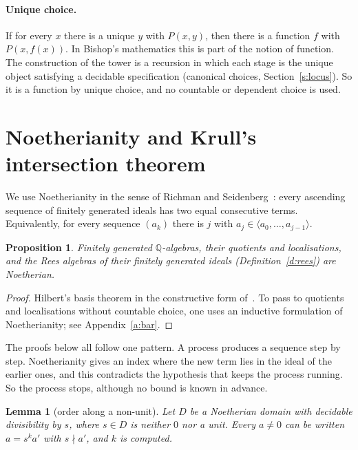 \documentclass[11pt]{article}
\newcommand{\Q}{\mathbb{Q}}
\numberwithin{equation}{section}
\theoremstyle{plain}
\newtheorem{proposition}[theorem]{Proposition}
\newtheorem{lemma}[theorem]{Lemma}
\theoremstyle{definition}
\theoremstyle{remark}
\begin{document}
\paragraph{Unique choice.} If for every $x$ there is a unique $y$ with $P(x,y)$, then there is a
function $f$ with $P(x,f(x))$. In Bishop's mathematics this is part of the notion of function. The
construction of the tower is a recursion in which each stage is the unique object satisfying a
decidable specification (canonical choices, Section~\ref{s:locus}). So it is a function by unique
choice, and no countable or dependent choice is used.

\section{Noetherianity and Krull's intersection theorem}\label{s:noeth}

We use Noetherianity in the sense of Richman and Seidenberg~\cite[II-3.2]{LQ}: every ascending
sequence of finitely generated ideals has two equal consecutive terms. Equivalently, for every
sequence $(a_k)$ there is $j$ with $a_j\in\langle a_0,\dots,a_{j-1}\rangle$.

\begin{proposition}\label{p:hilbert}
Finitely generated $\Q$-algebras, their quotients and localisations, and the Rees algebras of
their finitely generated ideals (Definition~\ref{d:rees}) are Noetherian.
\end{proposition}

\begin{proof}
Hilbert's basis theorem in the constructive form of~\cite{CP}. To pass to quotients and
localisations without countable choice, one uses an inductive formulation of Noetherianity; see
Appendix~\ref{a:bar}.
\end{proof}

The proofs below all follow one pattern. A process produces a sequence step by step. Noetherianity
gives an index where the new term lies in the ideal of the earlier ones, and this contradicts the
hypothesis that keeps the process running. So the process stops, although no bound is known in
advance.

\begin{lemma}[order along a non-unit]\label{l:sorder}
Let $D$ be a Noetherian domain with decidable divisibility by $s$, where $s\in D$ is neither $0$ nor
a unit. Every $a\ne0$
can be written $a=s^ka'$ with $s\nmid a'$, and $k$ is computed.
\end{lemma}
\end{document}
